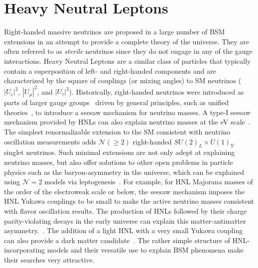 \section{Heavy Neutral Leptons}\label{sec:hnl}

Right-handed massive neutrinos are proposed in a large number of BSM extensions in an attempt to provide a complete theory of the universe. They are often referred to as \textit{sterile} neutrinos since they do not engage in any of the gauge interactions. Heavy Neutral Leptons are a similar class of particles that typically contain a superposition of left- and right-handed components and are characterized by the square of couplings (or mixing angles) to SM neutrinos ($|U_e|^2$, $|U_\mu|^2$, and $|U_\tau|^2$). Historically, right-handed neutrinos were introduced as parts of larger gauge groups~\cite{PhysRevD.11.2558} driven by general principles, such as unified theories~\cite{PhysRevD.10.275}, to introduce a seesaw mechanism for neutrino masses. A type-I seesaw mechanism provided by HNLs can also explain neutrino masses at the eV scale~\cite{PhysRevD.22.2227}. The simplest renormalizable extension to the SM consistent with neutrino oscillation measurements adds $\mathcal{N}(\geq 2)$ right-handed $SU(2)_L\times U(1)_Y$ singlet neutrinos. Such minimal extensions are not only adept at explaining neutrino masses, but also offer solutions to other open problems in particle physics such as the baryon-asymmetry in the universe, which can be explained using $\mathcal{N}=2$ models via leptogenesis~\cite{Kuzmin1985}. For example, for HNL Majorana masses of the order of the electroweak scale or below, the seesaw mechanism imposes the HNL Yukawa couplings to be small to make the active neutrino masses consistent with flavor oscillation results. The production of HNLs followed by their charge parity-violating decays in the early universe can explain this matter-antimatter asymmetry.~\cite{Asaka2005, Fukugita1986}. The addition of a light HNL with a very small Yukawa coupling can also provide a dark matter candidate~\cite{PhysRevLett.72.17, Asaka2005}. The rather simple structure of HNL-incorporating models and their versatile use to explain BSM phenomena make their searches very attractive.

